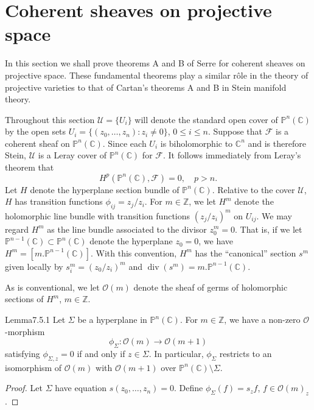 \section{Coherent sheaves on projective space}\label{sec:7:5}
In this section we shall prove theorems A and B of Serre for coherent sheaves on projective space. These fundamental theorems play a similar r\^ole in the theory of projective varieties to that of Cartan's theorems A and B in Stein manifold theory.

Throughout this section $\mathcal U=\{U_i\}$ will denote the standard open cover of $\mathbb P^n(\mathbb C)$ by the open sets $U_i=\{(z_0,\ldots,z_n):z_i\ne0\}$, $0\leq i\leq n$. Suppose that $\mathcal F$ is a coherent sheaf on $\mathbb P^n(\mathbb C)$. Since each $U_i$ is biholomorphic to $\mathbb C^n$ and is therefore Stein, $\mathcal U$ is a Leray cover of $\mathbb P^n(\mathbb C)$ for $\mathcal F$. It follows immediately from Leray's theorem that
\[
H^p(\mathbb P^n(\mathbb C),\mathcal F)=0,\quad p>n.
\]
Let $H$ denote the hyperplane section bundle of $\mathbb P^n(\mathbb C)$. Relative to the cover $\mathcal U$, $H$ has transition functions $\phi_{ij}=z_j/z_i$. For $m\in\mathbb Z$, we let $H^m$ denote the holomorphic line bundle with transition functions $(z_j/z_i)^m$ on $U_{ij}$. We may regard $H^m$ as the line bundle associated to the divisor $z_0^m=0$. That is, if we let $\mathbb P^{n-1}(\mathbb C)\subset\mathbb P^n(\mathbb C)$ denote the hyperplane $z_0=0$, we have $H^m=[m.\mathbb P^{n-1}(\mathbb C)]$. With this convention, $H^m$ has the ``canonical'' section $s^m$ given locally by $s_i^m=(z_0/z_i)^m$ and $\operatorname{div}(s^m)=m.\mathbb P^{n-1}(\mathbb C)$.

As is conventional, we let $\mathcal O(m)$ denote the sheaf of germs of holomorphic sections of $H^m$, $m\in\mathbb Z$.
\begin{originaltheorem}{Lemma}{7.5.1}
Let $\Sigma$ be a hyperplane in $\mathbb P^n(\mathbb C)$. For $m\in\mathbb Z$, we have a non-zero $\mathcal O$-morphism
\[
\phi_\Sigma:\mathcal O(m)\to\mathcal O(m+1)
\]
satisfying $\phi_{\Sigma,z}=0$ if and only if $z\in\Sigma$. In particular, $\phi_\Sigma$ restricts to an isomorphism of $\mathcal O(m)$ with $\mathcal O(m+1)$ over $\mathbb P^n(\mathbb C)\setminus\Sigma$.
\end{originaltheorem}
\begin{proof}
Let $\Sigma$ have equation $s(z_0,\ldots,z_n)=0$. Define $\phi_\Sigma(f)=s_zf$, $f\in\mathcal O(m)_z$.
\end{proof}
